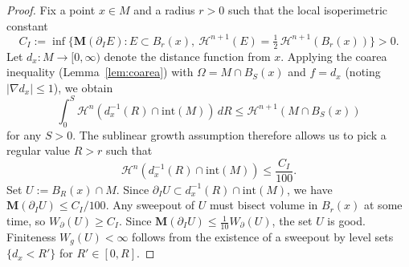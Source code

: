 \begin{proof}
Fix a point $x \in M$ and a radius $r > 0$ such that the local isoperimetric constant
\[
C_I := \inf\bigl\{\mathbf{M}(\partial_I E) : E \subset B_r(x),\ \mathcal{H}^{n+1}(E) = \tfrac{1}{2}\,\mathcal{H}^{n+1}(B_r(x))\bigr\} > 0.
\]
Let $d_x: M \to [0, \infty)$ denote the distance function from $x$. Applying the coarea inequality (Lemma~\ref{lem:coarea}) with $\Omega = M \cap B_S(x)$ and $f = d_x$ (noting $|\nabla d_x| \leq 1$), we obtain
\[
\int_0^S \mathcal{H}^n(d_x^{-1}(R) \cap \mathrm{int}(M))\, dR \leq \mathcal{H}^{n+1}(M \cap B_S(x))
\]
for any $S > 0$. The sublinear growth assumption therefore allows us to pick a regular value $R > r$ such that
\[
\mathcal{H}^n(d_x^{-1}(R) \cap \mathrm{int}(M)) \leq \frac{C_I}{100}.
\]
Set $U := B_R(x) \cap M$. Since $\partial_I U \subset d_x^{-1}(R) \cap \mathrm{int}(M)$, we have $\mathbf{M}(\partial_I U) \leq C_I/100$. Any sweepout of $U$ must bisect volume in $B_r(x)$ at some time, so $W_\partial(U) \geq C_I$. Since $\mathbf{M}(\partial_I U) \leq \frac{1}{10} W_\partial(U)$, the set $U$ is good. Finiteness $W_g(U) < \infty$ follows from the existence of a sweepout by level sets $\{d_x < R'\}$ for $R' \in [0, R]$.
\end{proof}